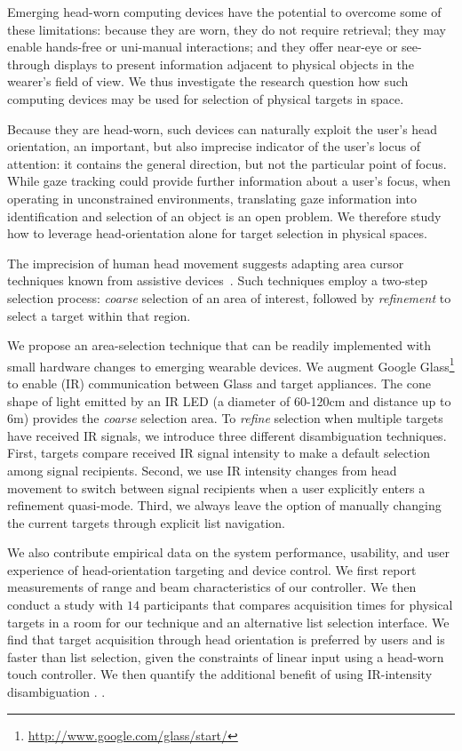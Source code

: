 Emerging head-worn computing devices have the potential to overcome some of these limitations: because they are worn, they do not require retrieval; they may enable hands-free or uni-manual interactions; and they offer near-eye or see-through displays to present information adjacent to physical objects in the wearer's field of view. We thus investigate the research question how such computing devices may be used for selection of physical targets in space.

Because they are head-worn, such devices can naturally exploit the user's head orientation, an important, but also imprecise indicator of the user's locus of attention: it contains the general direction, but not the particular point of focus. While gaze tracking could provide further information about a user's focus, when operating in unconstrained environments, translating gaze information into identification and selection of an object is an open problem.
We therefore study how to leverage head-orientation alone for target selection in physical spaces. 

The imprecision of human head movement suggests adapting area cursor techniques known from assistive devices~\cite{kabbash1995prince,worden1997making,Findlater-uist2010}. Such techniques employ a two-step selection process: {\em coarse} selection of an area of interest, followed by {\em refinement} to select a target within that region.

We propose an area-selection technique that can be readily implemented with small hardware changes to emerging wearable devices. We augment Google Glass\footnote{\url{http://www.google.com/glass/start/}} to enable (IR) communication between Glass and target appliances. The cone shape of light emitted by an IR LED (a diameter of 60-120cm and distance up to 6m) provides the {\em coarse} selection area. To {\em refine} selection when multiple targets have received IR signals, we introduce three different disambiguation techniques. First, targets compare received IR signal intensity to make a default selection among signal recipients. Second, we use IR intensity changes from head movement to switch between signal recipients when a user explicitly enters a refinement quasi-mode. Third, we always leave the option of manually changing the current targets through explicit list navigation.

We also contribute empirical data on the system performance, usability, and user experience of head-orientation targeting and device control. We first report measurements of range and beam characteristics of our controller. We then conduct a study with $14$ participants that compares acquisition times for physical targets in a room for our technique and an alternative list selection interface. We find that target acquisition through head orientation is preferred by users and is faster than list selection, given the constraints of linear input using a head-worn touch controller. 
We then quantify the additional benefit of using IR-intensity disambiguation . .

